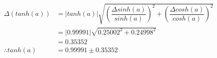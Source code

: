 \documentclass[a4paper]{article}
\begin{document}
\begin{align*}
\Delta \left( tanh \left( a \right) \right) &= \left| tanh \left( a \right) \right|\sqrt{ \left( \dfrac{ \Delta sinh \left( a \right) }{ sinh \left( a \right) } \right) ^ { 2 } + \left( \dfrac{ \Delta cosh \left( a \right) }{ cosh \left( a \right) } \right) ^ { 2 }} \\
&= \left| 0.99991 \right|\sqrt{ 0.25002 ^ { 2 } + 0.24998 ^ { 2 }} \\
&= 0.35352\\[4mm]
\therefore tanh \left( a \right) &= 0.99991 \pm 0.35352
\end{align*}
\end{document}
